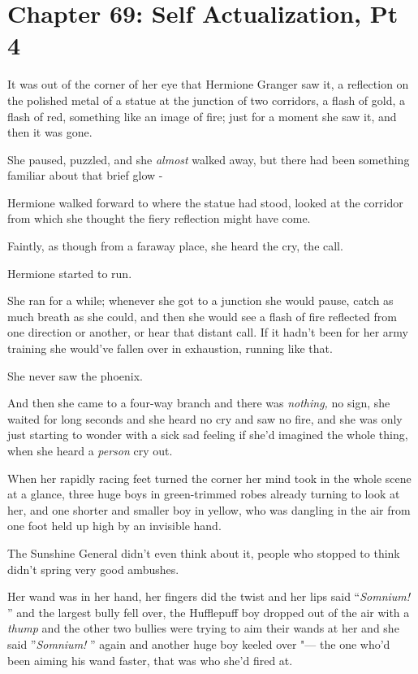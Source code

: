 \chapter{Chapter 69: Self Actualization, Pt 4}
It was out of the corner of her eye that Hermione Granger saw it, a
reflection on the polished metal of a statue at the junction of two
corridors, a flash of gold, a flash of red, something like an image of
fire; just for a moment she saw it, and then it was gone.

She paused, puzzled, and she \emph{almost} walked away, but there had
been something familiar about that brief glow -

Hermione walked forward to where the statue had stood, looked at the
corridor from which she thought the fiery reflection might have come.

Faintly, as though from a faraway place, she heard the cry, the call.

Hermione started to run.

She ran for a while; whenever she got to a junction she would pause,
catch as much breath as she could, and then she would see a flash of
fire reflected from one direction or another, or hear that distant call.
If it hadn't been for her army training she would've fallen over in
exhaustion, running like that.

She never saw the phoenix.

And then she came to a four-way branch and there was \emph{nothing,} no
sign, she waited for long seconds and she heard no cry and saw no fire,
and she was only just starting to wonder with a sick sad feeling if
she'd imagined the whole thing, when she heard a \emph{person} cry out.

When her rapidly racing feet turned the corner her mind took in the
whole scene at a glance, three huge boys in green-trimmed robes already
turning to look at her, and one shorter and smaller boy in yellow, who
was dangling in the air from one foot held up high by an invisible hand.

The Sunshine General didn't even think about it, people who stopped to
think didn't spring very good ambushes.

Her wand was in her hand, her fingers did the twist and her lips said
``\emph{Somnium!} '' and the largest bully fell over, the Hufflepuff boy
dropped out of the air with a \emph{thump} and the other two bullies
were trying to aim their wands at her and she said ''\emph{Somnium!} ''
again and another huge boy keeled over "--- the one who'd been aiming his
wand faster, that was who she'd fired at.

